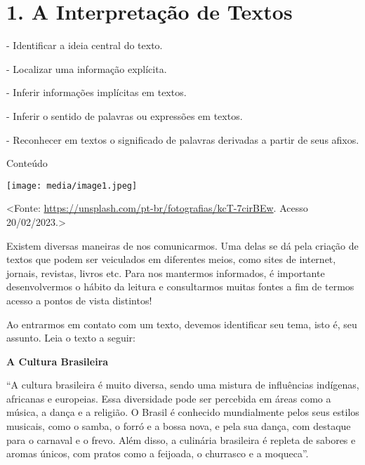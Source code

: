 \chapter{1. A Interpretação de Textos}



\begin{itemize}
- Identificar a ideia central do texto.

- Localizar uma informação explícita.

- Inferir informações implícitas em textos.

- Inferir o sentido de palavras ou expressões em textos.

- Reconhecer em textos o significado de palavras derivadas a partir de
seus afixos.
\end{itemize}

Conteúdo

\texttt{[image: media/image1.jpeg]}

\textless{}Fonte:
\url{https://unsplash.com/pt-br/fotografias/kcT-7cirBEw}. Acesso
20/02/2023.\textgreater{}

Existem diversas maneiras de nos comunicarmos. Uma delas se dá pela
criação de textos que podem ser veiculados em diferentes meios, como
sites de internet, jornais, revistas, livros etc. Para nos mantermos
informados, é importante desenvolvermos o hábito da leitura e
consultarmos muitas fontes a fim de termos acesso a pontos de vista
distintos!

Ao entrarmos em contato com um texto, devemos identificar seu tema, isto
é, seu assunto. Leia o texto a seguir:

\textbf{A Cultura Brasileira}

``A cultura brasileira é muito diversa, sendo uma mistura de influências
indígenas, africanas e europeias. Essa diversidade pode ser percebida em
áreas como a música, a dança e a religião. O Brasil é conhecido
mundialmente pelos seus estilos musicais, como o samba, o forró e a
bossa nova, e pela sua dança, com destaque para o carnaval e o frevo.
Além disso, a culinária brasileira é repleta de sabores e aromas únicos,
com pratos como a feijoada, o churrasco e a moqueca''.

